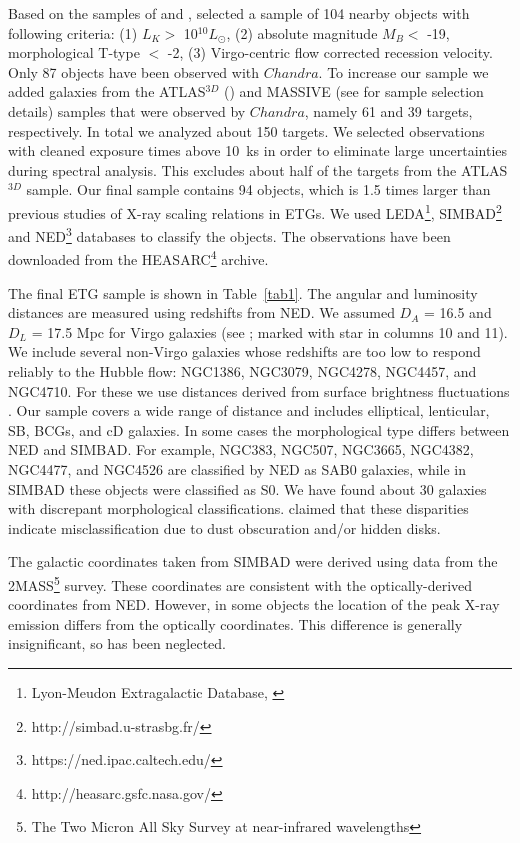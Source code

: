 \documentclass[iop]{emulateapj}
\begin{document}
Based on the samples of \citet{Beuing_sample:99} and \citet{OSullivan_sample:03}, \citet{Nulsen:09} selected a sample of 104 nearby objects with following criteria: (1) $L_K > $ 10$^{10} L_{\odot}$, (2) absolute magnitude $M_{B} < $ -19, morphological T-type $<$ -2, (3) Virgo-centric flow corrected recession velocity. Only 87 objects have been observed with $Chandra$. To increase our sample we added galaxies from the ATLAS$^{3D}$ (\citealt{Cappellari:11}) and MASSIVE (see \citet{Ma_sample} for sample selection details) samples that were observed by $Chandra$, namely 61 and 39 targets, respectively. In total we analyzed about 150 targets. We selected observations with cleaned exposure times above 10~ks in order to eliminate large uncertainties during spectral analysis. This excludes about half of the targets from the ATLAS$^{3D}$ sample. Our final sample contains 94 objects, which is 1.5 times larger than previous studies of X-ray scaling relations in ETGs. We used LEDA\footnote{Lyon-Meudon Extragalactic Database, \cite{Paturel:97}}, SIMBAD\footnote{http://simbad.u-strasbg.fr/} and NED\footnote{https://ned.ipac.caltech.edu/} databases to classify the objects. The observations have been downloaded from the HEASARC\footnote{http://heasarc.gsfc.nasa.gov/} archive. 

The final ETG sample is shown in Table~\ref{tab1}. The angular and luminosity distances are measured using redshifts from NED. We assumed $D_A$ = 16.5 and $D_L$ = 17.5 Mpc for Virgo galaxies (see \citealt{Cappellari:11}; marked with star in columns 10 and 11).  We include several non-Virgo galaxies whose redshifts are too low to respond reliably to the Hubble flow: NGC1386, NGC3079, NGC4278, NGC4457, and NGC4710. For these we use distances derived from surface brightness fluctuations \citep{Mei:07}. Our sample covers a wide range of distance and includes elliptical, lenticular, SB, BCGs, and cD galaxies. In some cases the morphological type differs between NED and SIMBAD. For example, NGC383, NGC507, NGC3665, NGC4382, NGC4477, and NGC4526 are classified by NED as SAB0 galaxies, while in SIMBAD these objects were classified as S0. We have found about 30 galaxies with discrepant morphological classifications. \citet{Kim:15} claimed that these disparities indicate misclassification due to dust obscuration and/or hidden disks.

The galactic coordinates taken from SIMBAD were derived using data from the 2MASS\footnote{The Two Micron All Sky Survey at near-infrared wavelengths} survey. These coordinates are consistent with the optically-derived coordinates from NED. However, in some objects the location of the peak X-ray emission differs from the optically coordinates. This difference is generally insignificant, so has been neglected. 
\end{document}
